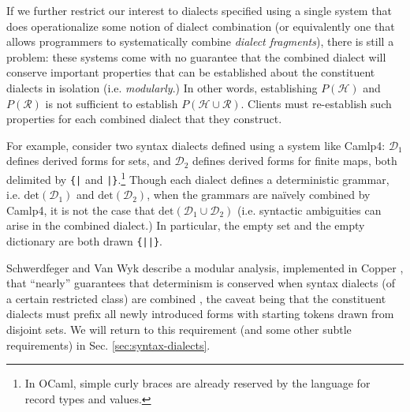 If we further restrict our interest  to dialects specified using a single system that does operationalize some notion of dialect combination (or equivalently one that allows programmers to systematically combine \emph{dialect fragments}), there is still a problem: these systems come with no guarantee that the combined dialect will conserve important properties that can be established about the constituent dialects in isolation (i.e. \emph{modularly}.) In other words, establishing $P(\mathcal{H})$ and $P(\mathcal{R})$ is not sufficient to establish $P(\mathcal{H} \cup \mathcal{R})$. Clients must re-establish such properties for each combined dialect that they construct.%

For example, consider two syntax dialects defined using a system like Camlp4: $\mathcal{D}_1$ defines derived forms for sets, and $\mathcal{D}_2$ defines derived forms for finite maps, both delimited by \verb~{|~ and \verb~|}~.\footnote{In OCaml, simple curly braces are already reserved by the language for record types and values.} Though each dialect defines a deterministic grammar, i.e. $\mathrm{det}(\mathcal{D}_1)$ and $\mathrm{det}(\mathcal{D}_2)$, when the grammars are na\"ively combined by Camlp4, it is not the case that $\mathrm{det}(\mathcal{D}_1 \cup \mathcal{D}_2)$ (i.e. syntactic ambiguities can arise in the combined dialect.) In particular, the empty set and the empty dictionary are both drawn \verb~{||}~. %

Schwerdfeger and Van Wyk describe a modular analysis, implemented in Copper \cite{conf/gpce/WykS07}, that ``nearly'' guarantees that determinism is conserved when syntax dialects (of a certain restricted class) are combined \cite{conf/pldi/SchwerdfegerW09}, the caveat being that the constituent dialects must prefix all newly introduced forms with starting tokens drawn from disjoint sets. We will return to this requirement (and some other subtle requirements) in Sec. \ref{sec:syntax-dialects}.



